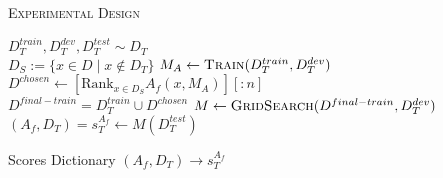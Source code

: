 \begin{algorithm}[htb]
    \caption{\label{alg:exp-design}\textsc{Experimental Design}}
  \label{alg:experiment}
\begin{algorithmic}[1]
  \footnotesize
  \STATE $D_{T}^{train}, D_{T}^{dev}, D_{T}^{test} \sim D_T$ \\
  \STATE $D_{S} := \{x \in D \; | \; x \notin D_T \}$
  \STATE $M_A \leftarrow \textsc{Train}(D_{T}^{train}, D_{T}^{dev})$\\
  \STATE $D^{chosen} \leftarrow [\text{Rank}_{x \in D_{S}} A_{f}(x, M_A)][:n]$\\
  \STATE $D^{final-train} = D_T^{train} \cup D^{chosen}$
  \STATE $M \leftarrow \textsc{GridSearch} (D^{final-train}, D_{T}^{dev})$\\
  \STATE $(A_f, D_T) = s_T^{A_f} \leftarrow  M(D_{T}^{test}) $ \\
  \ENDFOR
  \ENDFOR

  \RETURN Scores Dictionary $(A_f, D_T) \rightarrow s_T^{A_f}$ \\
\end{algorithmic}
\end{algorithm}


  
  
  
